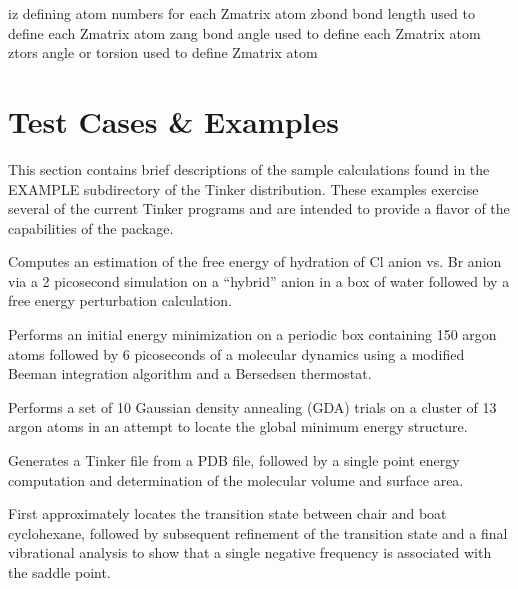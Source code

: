 \documentclass[letterpaper,11pt,english]{sphinxmanual}
\begin{document}

\begin{sphinxVerbatim}[commandchars=\\\{\}]
iz              defining atom numbers for each Z\PYGZhy{}matrix atom
zbond           bond length used to define each Z\PYGZhy{}matrix atom
zang            bond angle used to define each Z\PYGZhy{}matrix atom
ztors           angle or torsion used to define Z\PYGZhy{}matrix atom
\end{sphinxVerbatim}


\chapter{Test Cases \& Examples}
\label{\detokenize{text/test-cases:test-cases-examples}}\label{\detokenize{text/test-cases::doc}}
This section contains brief descriptions of the sample calculations found in the EXAMPLE subdirectory of the Tinker distribution. These examples exercise several of the current Tinker programs and are intended to provide a flavor of the capabilities of the package.


Computes an estimation of the free energy of hydration of Cl\sphinxhyphen{} anion vs. Br\sphinxhyphen{} anion via a 2 picosecond simulation on a “hybrid” anion in a box of water followed by a free energy perturbation calculation.


Performs an initial energy minimization on a periodic box containing 150 argon atoms followed by 6 picoseconds of a molecular dynamics using a modified Beeman integration algorithm and a Bersedsen thermostat.


Performs a set of 10 Gaussian density annealing (GDA) trials on a cluster of 13 argon atoms in an attempt to locate the global minimum energy structure.


Generates a Tinker file from a PDB file, followed by a single point energy computation and determination of the molecular volume and surface area.


First approximately locates the transition state between chair and boat cyclohexane, followed by subsequent refinement of the transition state and a final vibrational analysis to show that a single negative frequency is associated with the saddle point.
\end{document}
